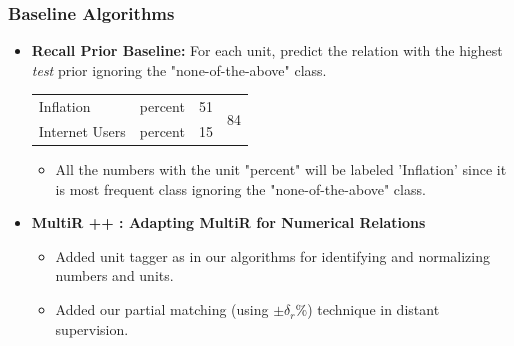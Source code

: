 \documentclass{beamer}
\begin{document}

\begin{frame}
\frametitle{Baseline Algorithms}
\begin{itemize}
\setlength\itemsep{2em}
\item \textbf{Recall \textendash Prior Baseline: } For each unit, predict the relation with the highest \emph{test} prior ignoring the "none-of-the-above" class.
\begin{small}
\begin{table}[h]
\centering
     \begin{adjustbox}{max width=\textwidth}
        \begin{tabular}{|l|c|c|c|}
            \hline
            
            \multicolumn{1}{|l|}{Inflation}  & \multicolumn{1}{c}{percent} & \multicolumn{1}{|c|}{51} & \multirow{2}{*}{84} \\\cline{1-2}
            \multicolumn{1}{|l|}{Internet Users} & \multicolumn{1}{c}{percent} & \multicolumn{1}{|c|}{15} & \\\cline{1-2} 
            
            \hline
        \end{tabular}
	\end{adjustbox}
   
\end{table}
\end{small}

\begin{itemize}
	\item All the numbers with the unit "percent" will be labeled 'Inflation' since it is most frequent class 
	ignoring the "none-of-the-above" class. \pause
\end{itemize}


\item \textbf{MultiR ++ : Adapting MultiR for Numerical Relations}
\begin{itemize}
\item Added unit tagger as in our algorithms for identifying and normalizing numbers and units.
\item Added our partial matching (using $\pm \delta_r\%$) technique in distant supervision.
\end{itemize}
\end{itemize}
\end{frame}
\end{document}
